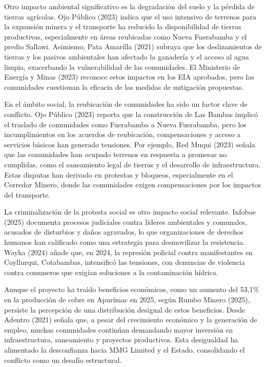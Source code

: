 \documentclass[
  stu,
  floatsintext,
  longtable,
  a4paper,
  nolmodern,
  notxfonts,
  notimes,
  colorlinks=true,linkcolor=blue,citecolor=blue,urlcolor=blue]{apa7}
\begin{document}
Otro impacto ambiental significativo es la degradación del suelo y la
pérdida de tierras agrícolas. Ojo Público (2023) indica que el uso
intensivo de terrenos para la expansión minera y el transporte ha
reducido la disponibilidad de tierras productivas, especialmente en
áreas reubicadas como Nueva Fuerabamba y el predio Sallawi. Asimismo,
Pata Amarilla (2021) subraya que los deslizamientos de tierras y los
pasivos ambientales han afectado la ganadería y el acceso al agua
limpia, exacerbando la vulnerabilidad de las comunidades. El Ministerio
de Energía y Minas (2023) reconoce estos impactos en los EIA aprobados,
pero las comunidades cuestionan la eficacia de las medidas de mitigación
propuestas.

En el ámbito social, la reubicación de comunidades ha sido un factor
clave de conflicto. Ojo Público (2023) reporta que la construcción de
Las Bambas implicó el traslado de comunidades como Fuerabamba a Nueva
Fuerabamba, pero los incumplimientos en los acuerdos de reubicación,
compensaciones y acceso a servicios básicos han generado tensiones. Por
ejemplo, Red Muqui (2023) señala que las comunidades han ocupado
terrenos en respuesta a promesas no cumplidas, como el saneamiento legal
de tierras y el desarrollo de infraestructura. Estas disputas han
derivado en protestas y bloqueos, especialmente en el Corredor Minero,
donde las comunidades exigen compensaciones por los impactos del
transporte.

La criminalización de la protesta social es otro impacto social
relevante. Infobae (2025) documenta procesos judiciales contra líderes
ambientales y comunales, acusados de disturbios y daños agravados, lo
que organizaciones de derechos humanos han calificado como una
estrategia para desmovilizar la resistencia. Wayka (2024) añade que, en
2024, la represión policial contra manifestantes en Coyllurqui,
Cotabambas, intensificó las tensiones, con denuncias de violencia contra
comuneros que exigían soluciones a la contaminación hídrica.

Aunque el proyecto ha traído beneficios económicos, como un aumento del
53,1\% en la producción de cobre en Apurímac en 2025, según Rumbo Minero
(2025), persiste la percepción de una distribución desigual de estos
beneficios. Desde Adentro (2021) señala que, a pesar del crecimiento
económico y la generación de empleo, muchas comunidades continúan
demandando mayor inversión en infraestructura, saneamiento y proyectos
productivos. Esta desigualdad ha alimentado la desconfianza hacia MMG
Limited y el Estado, consolidando el conflicto como un desafío
estructural.
\end{document}
